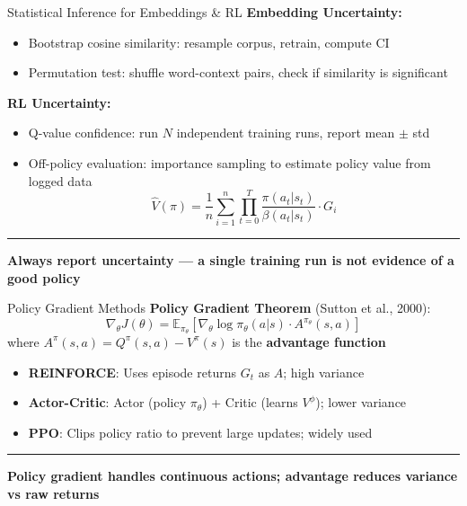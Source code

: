 \documentclass[8pt,aspectratio=169]{beamer}
\newcommand{\bottomnote}[1]{%
\vfill
\vspace{-2mm}
\textcolor{mllavender2}{\rule{\textwidth}{0.4pt}}
\vspace{1mm}
\footnotesize
\textbf{#1}
}
\begin{document}
\begin{frame}[t]{Statistical Inference for Embeddings \& RL}
\textbf{Embedding Uncertainty:}
\begin{itemize}
\item Bootstrap cosine similarity: resample corpus, retrain, compute CI
\item Permutation test: shuffle word-context pairs, check if similarity is significant
\end{itemize}
\vspace{0.5em}
\textbf{RL Uncertainty:}
\begin{itemize}
\item Q-value confidence: run $N$ independent training runs, report mean $\pm$ std
\item Off-policy evaluation: importance sampling to estimate policy value from logged data
\[
\hat{V}(\pi) = \frac{1}{n}\sum_{i=1}^{n} \prod_{t=0}^{T} \frac{\pi(a_t|s_t)}{\beta(a_t|s_t)} \cdot G_i
\]
\end{itemize}
\bottomnote{Always report uncertainty --- a single training run is not evidence of a good policy}
\end{frame}

\begin{frame}[t]{Policy Gradient Methods}
\textbf{Policy Gradient Theorem} (Sutton et al., 2000):
\[
\nabla_\theta J(\theta) = \mathbb{E}_{\pi_\theta} \left[ \nabla_\theta \log \pi_\theta(a|s) \cdot A^{\pi_\theta}(s, a) \right]
\]
where $A^\pi(s,a) = Q^\pi(s,a) - V^\pi(s)$ is the \textbf{advantage function}
\vspace{0.3em}
\begin{itemize}
\item \textbf{REINFORCE}: Uses episode returns $G_t$ as $A$; high variance
\item \textbf{Actor-Critic}: Actor (policy $\pi_\theta$) + Critic (learns $V^\phi$); lower variance
\item \textbf{PPO}: Clips policy ratio to prevent large updates; widely used
\end{itemize}
\bottomnote{Policy gradient handles continuous actions; advantage reduces variance vs raw returns}
\end{frame}
\end{document}
